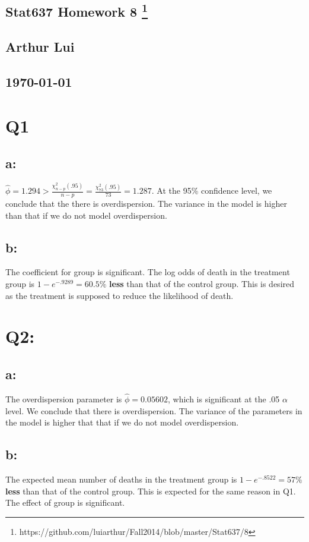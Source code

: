 \documentclass{article}
\begin{document}
\begin{center}
  \section*{\textbf{Stat637 Homework 8}
    \footnote{https://github.com/luiarthur/Fall2014/blob/master/Stat637/8}
  }  
  \subsection*{\textbf{Arthur Lui}}
  \subsection*{\noindent\today}
\end{center}


\section*{Q1}
\subsection*{a:}
$\hat\phi = 1.294 > \frac{\chi^2_{n-p}(.95)}{n-p} =
\frac{\chi^2_{73}(.95)}{73} = 1.287$. At the 95\% confidence level, we
conclude that the there is overdispersion. The variance in the model is
higher than that if we do not model overdispersion.

\subsection*{b:}
The coefficient for group is significant. The log odds of death in the
treatment group is $1-e^{-.9289}=60.5\%$ \textbf{less} than that of the
control group. This is desired as the treatment is supposed to reduce the
likelihood of death.

\section*{Q2:}
\subsection*{a:}
The overdispersion parameter is $\hat\phi=0.05602$, which is significant at
the .05 $\alpha$ level. We conclude that there is overdispersion. The
variance of the parameters in the model is higher that that if we do not
model overdispersion.

\subsection*{b:}
The expected mean number of deaths in the treatment group is $1-e^{-.8522}
= 57\%$ \textbf{less} than that of the control group. This is expected for
the same reason in Q1. The effect of group is significant.
\end{document}
